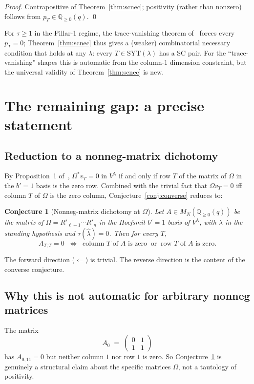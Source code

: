 \documentclass[11pt]{article}
\newtheorem{conjecture}[theorem]{Conjecture}
\theoremstyle{definition}
\newcommand{\Vlam}{V^\lambda}
\newcommand{\Om}{\Omega}
\newcommand{\Omstar}{\Omega^{\ast}}
\newcommand{\hatl}{\widehat\lambda}
\newcommand{\Rp}{{R'}}
\newcommand{\SYT}{\mathrm{SYT}}
\newcommand{\pT}{p_T}
\newcommand{\Qge}{\mathbb{Q}_{\ge 0}(q)}
\begin{document}
\begin{proof}
Contrapositive of Theorem~\ref{thm:scnec}; positivity (rather than
nonzero) follows from $\pT \in \Qge$. \qed
\end{proof}

For $\tau \ge 1$ in the Pillar-1 regime, the trace-vanishing theorem
of~\cite{pillar1} forces every $\pT = 0$; Theorem~\ref{thm:scnec} thus
gives a (weaker) combinatorial necessary condition that holds at any
$\lambda$: every $T \in \SYT(\lambda)$ has a SC pair. For the
``trace-vanishing'' shapes this is automatic from the column-1 dimension
constraint, but the universal validity of Theorem~\ref{thm:scnec} is new.

\section{The remaining gap: a precise statement}

\subsection{Reduction to a nonneg-matrix dichotomy}

By Proposition~1 of~\cite{dclassRowZero}, $\Omstar v_T = 0$ in $\Vlam$ if
and only if row $T$ of the matrix of $\Om$ in the $b'\!=\!1$ basis is the
zero row. Combined with the trivial fact that $\Om v_T = 0$ iff column $T$
of $\Om$ is the zero column, Conjecture~\ref{conj:converse} reduces to:

\begin{conjecture}[Nonneg-matrix dichotomy at $\Om$]\label{conj:posrigid}
Let $A \in M_N(\Qge)$ be the matrix of $\Om = \Rp_{\ell+1} \cdots \Rp_n$
in the Hoefsmit $b'\!=\!1$ basis of $\Vlam$, with $\lambda$ in the
standing hypothesis and $\tau(\hatl) = 0$. Then for every $T$,
\[
   A_{T,T} = 0
   \;\;\Longleftrightarrow\;\;
   \text{column $T$ of $A$ is zero}
   \;\;\text{or}\;\;
   \text{row $T$ of $A$ is zero}.
\]
\end{conjecture}

The forward direction ($\Leftarrow$) is trivial. The reverse direction is
the content of the converse conjecture.

\subsection{Why this is not automatic for arbitrary nonneg matrices}

The matrix
\[
   A_0 \;=\; \begin{pmatrix} 0 & 1 \\ 1 & 1 \end{pmatrix}
\]
has $A_{0,11} = 0$ but neither column $1$ nor row $1$ is zero. So
Conjecture~\ref{conj:posrigid} is genuinely a structural claim about
the specific matrices $\Om$, not a tautology of positivity.
\end{document}
